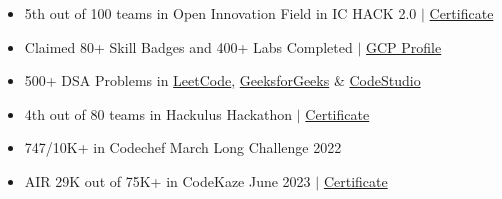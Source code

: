 \documentclass[letterpaper,11pt]{article}
\newcommand{\resumeItem}[1]{
  \item\small{
    {#1 \vspace{-2pt}}
  }
}
\newcommand{\resumeItemListStart}{\begin{itemize}}
\newcommand{\resumeItemListEnd}{\end{itemize}\vspace{-5pt}}
\begin{document}
    \begin{itemize}[leftmargin=0.15in, label={}]
    \small{\item{
    \resumeItemListStart
  \resumeItem{5th out of 100 teams in Open Innovation Field in IC HACK 2.0 $|$ \href{https://drive.google.com/file/d/1SeL0qU6O4hFTnG8Ef7F7ifKkHy5lRoSG/view?usp=sharing}{Certificate}}
   \resumeItem{Claimed 80+ Skill Badges and 400+ Labs Completed $|$ \href{https://www.cloudskillsboost.google/public_profiles/27c0ba2b-577b-4d32-a506-64591e89e383}{GCP Profile}}
  \resumeItem{500+ DSA Problems in \href{https://leetcode.com/tarunbisht-24/}{LeetCode}, \href{https://auth.geeksforgeeks.org/user/tarunbisht24}{GeeksforGeeks} \& \href{https://www.codingninjas.com/codestudio/profile/a5f5fd68-00b2-4d69-99c9-bfdcee24eee2}{CodeStudio}}
  \resumeItem{4th out of 80 teams in Hackulus Hackathon $|$ \href{https://drive.google.com/file/d/18ciyyMktMdTX3gtiTdu328mGsj4R-QYG/view?usp=sharing}{Certificate}}
  \resumeItem{747/10K+ in Codechef March Long Challenge 2022}
  \resumeItem{AIR 29K out of 75K+ in CodeKaze June 2023 $|$ \href{https://drive.google.com/file/d/1mMD2lqFVsxjVfZL1JmhHwPu7hafmTqpd/view?usp=sharing}{Certificate}}
  
    \resumeItemListEnd
    }}
    \end{itemize}




\end{document}
